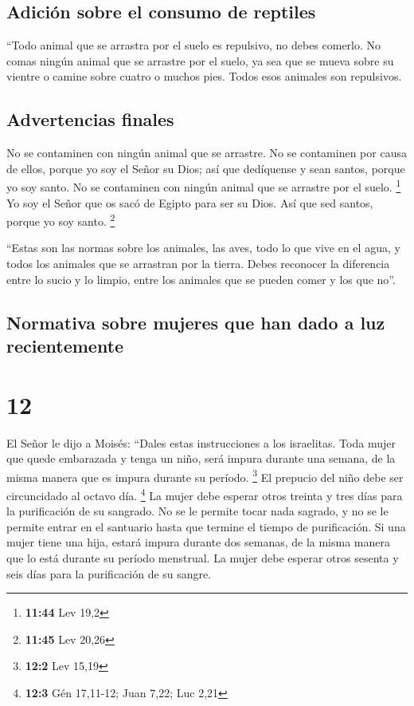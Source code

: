 \hypertarget{adiciuxf3n-sobre-el-consumo-de-reptiles}{%
\subsection{Adición sobre el consumo de
reptiles}\label{adiciuxf3n-sobre-el-consumo-de-reptiles}}

 ``Todo animal que se arrastra por el suelo es repulsivo,
no debes comerlo.  No comas ningún animal que se arrastre
por el suelo, ya sea que se mueva sobre su vientre o camine sobre cuatro
o muchos pies. Todos esos animales son repulsivos.

\hypertarget{advertencias-finales}{%
\subsection{Advertencias finales}\label{advertencias-finales}}

 No se contaminen con ningún animal que se arrastre. No
se contaminen por causa de ellos,  porque yo soy el Señor
su Dios; así que dedíquense y sean santos, porque yo soy santo. No se
contaminen con ningún animal que se arrastre por el suelo. \footnote{\textbf{11:44}
  Lev 19,2}  Yo soy el Señor que os sacó de Egipto para
ser su Dios. Así que sed santos, porque yo soy santo. \footnote{\textbf{11:45}
  Lev 20,26}

 ``Estas son las normas sobre los animales, las aves,
todo lo que vive en el agua, y todos los animales que se arrastran por
la tierra.  Debes reconocer la diferencia entre lo sucio
y lo limpio, entre los animales que se pueden comer y los que no''.

\hypertarget{normativa-sobre-mujeres-que-han-dado-a-luz-recientemente}{%
\subsection{Normativa sobre mujeres que han dado a luz
recientemente}\label{normativa-sobre-mujeres-que-han-dado-a-luz-recientemente}}

\hypertarget{section-11}{%
\section{12}\label{section-11}}

 El Señor le dijo a Moisés: ``Dales estas instrucciones a
los israelitas.  Toda mujer que quede embarazada y tenga
un niño, será impura durante una semana, de la misma manera que es
impura durante su período. \footnote{\textbf{12:2} Lev 15,19}
 El prepucio del niño debe ser circuncidado al octavo día.
\footnote{\textbf{12:3} Gén 17,11-12; Juan 7,22; Luc 2,21}
 La mujer debe esperar otros treinta y tres días para la
purificación de su sangrado. No se le permite tocar nada sagrado, y no
se le permite entrar en el santuario hasta que termine el tiempo de
purificación.  Si una mujer tiene una hija, estará impura
durante dos semanas, de la misma manera que lo está durante su período
menstrual. La mujer debe esperar otros sesenta y seis días para la
purificación de su sangre.

